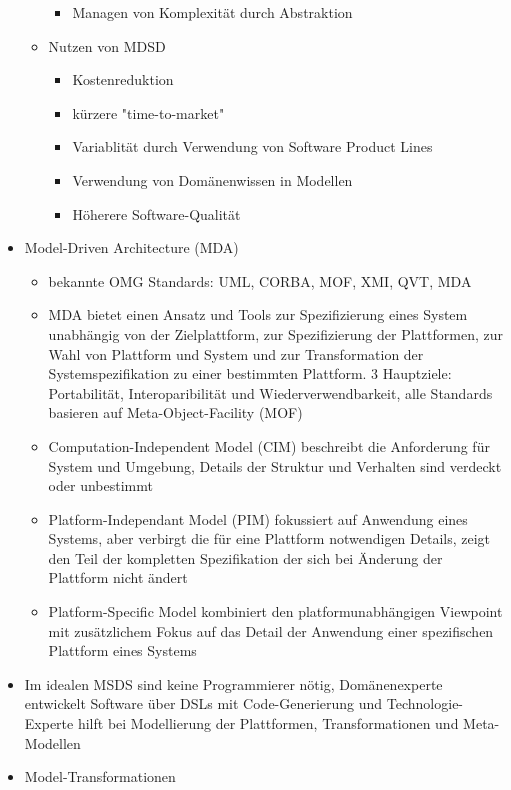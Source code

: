\documentclass[paper=a4, fontsize=11pt]{scrartcl} %
\numberwithin{equation}{section} %
\numberwithin{figure}{section} %
\numberwithin{table}{section} %
\begin{document}
\begin{itemize}
\begin{itemize}
\begin{itemize}
      \item Managen von Komplexität durch Abstraktion
    \end{itemize}
    \item Nutzen von MDSD
    \begin{itemize}
      \item Kostenreduktion
      \item kürzere "time-to-market"
      \item Variablität durch Verwendung von Software Product Lines
      \item Verwendung von Domänenwissen in Modellen
      \item Höherere Software-Qualität
    \end{itemize}
  \end{itemize}
  \item Model-Driven Architecture (MDA)
  \begin{itemize}
    \item bekannte OMG Standards: UML, CORBA, MOF, XMI, QVT, MDA
    \item MDA bietet einen Ansatz und Tools zur Spezifizierung eines System unabhängig von der Zielplattform, zur Spezifizierung der Plattformen, zur Wahl von Plattform und System und zur Transformation der Systemspezifikation zu einer bestimmten Plattform. 3 Hauptziele: Portabilität, Interoparibilität und Wiederverwendbarkeit, alle Standards basieren auf Meta-Object-Facility (MOF)
    \item Computation-Independent Model (CIM) beschreibt die Anforderung für System und Umgebung, Details der Struktur und Verhalten sind verdeckt oder unbestimmt
    \item Platform-Independant Model (PIM) fokussiert auf Anwendung eines Systems, aber verbirgt die für eine Plattform notwendigen Details, zeigt den Teil der kompletten Spezifikation der sich bei Änderung der Plattform nicht ändert
    \item Platform-Specific Model kombiniert den platformunabhängigen Viewpoint mit zusätzlichem Fokus auf das Detail der Anwendung einer spezifischen Plattform eines Systems
  \end{itemize}
  \item Im idealen MSDS sind keine Programmierer nötig, Domänenexperte entwickelt Software über DSLs mit Code-Generierung und Technologie-Experte hilft bei Modellierung der Plattformen, Transformationen und Meta-Modellen
  \item Model-Transformationen
  \begin{itemize}

\end{itemize}
\end{itemize}
\end{document}
